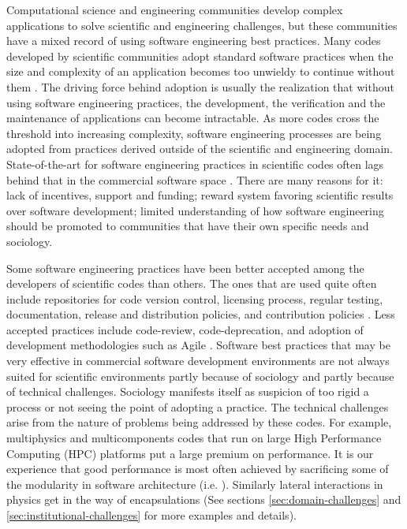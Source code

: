 \label{sec:introduction}
Computational science and engineering communities develop
complex applications to solve scientific and engineering challenges,
but these communities have a mixed record of using software
engineering best practices. Many codes developed by scientific communities
adopt standard software practices when the size and complexity of an
application becomes too unwieldy to continue without them
\cite{cc2012}. The driving force behind adoption is usually the
realization that without using software engineering practices, the
development, the verification and the maintenance of applications can become
intractable. As more codes cross the threshold into increasing
complexity, software engineering processes are being adopted from
practices derived outside of the scientific and engineering domain.
State-of-the-art for software engineering practices in scientific codes often lags
behind that in the commercial software space
\cite{segal2008developing,basili2008understanding, hochstein2008asc}. 
There are many reasons for it: lack of incentives, support and
funding; reward system favoring scientific results over software 
development; limited understanding of how software engineering
should be promoted to communities that have their own 
specific needs and sociology.

Some software engineering practices have been better accepted 
among the developers of scientific codes than others. The ones that are
used quite often include repositories for code version control,
licensing process, regular testing, documentation, release and distribution
policies, and contribution policies \cite{cc2012, carver2012software,
Dubey2014}. Less accepted practices include code-review,
code-deprecation, and adoption of development methodologies such as
Agile \cite{agile}. Software best practices that may be very effective in commercial
software development environments are not always suited for scientific
environments partly because of sociology and partly because of technical
challenges. Sociology manifests itself as suspicion of too rigid a
process or not seeing the point of adopting a practice. The
technical challenges arise from the nature of problems being addressed by
these codes. For example, multiphysics and multicomponents  
codes that run on large High Performance Computing 
(HPC) platforms put a large premium on performance. It is our
experience that good performance is most often achieved by sacrificing
some of the modularity in software architecture
(i.e. \cite{Dubey1999}). Similarly lateral interactions in physics get
in the way of encapsulations (See sections \ref{sec:domain-challenges}
and \ref{sec:institutional-challenges} for more examples and details).

